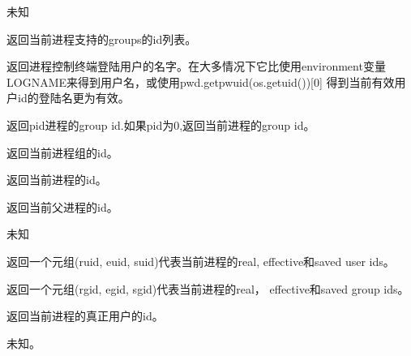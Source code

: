 \noindent{\color{red}{os.getgrouplist(user, group):}}
\par{未知}\\

\noindent{\color{red}{os.getgroups():}}
\par{返回当前进程支持的groups的id列表。}\\

\noindent{\color{red}{os.getlogin():}}
\par{返回进程控制终端登陆用户的名字。在大多情况下它比使用environment变量LOGNAME来得到用户名，或使用pwd.getpwuid(os.getuid())[0] 得到当前有效用户id的登陆名更为有效。}\\

\noindent{\color{red}{os.getpgid(pid):}}
\par{返回pid进程的group id.如果pid为0,返回当前进程的group id。}\\

\noindent{\color{red}{os.getpgrp():}}
\par{返回当前进程组的id。}\\

\noindent{\color{red}{os.getpid():}}
\par{返回当前进程的id。}\\

\noindent{\color{red}{os.getppid():}}
\par{返回当前父进程的id。}\\

\noindent{\color{red}{os.getpriority(which, who):}}
\par{未知}\\

\noindent{\color{red}{os.getresuid():}}
\par{返回一个元组(ruid, euid, suid)代表当前进程的real, effective和saved user ids。}\\

\noindent{\color{red}{os.getresgid():}}
\par{返回一个元组(rgid, egid, sgid)代表当前进程的real， effective和saved group ids。}\\

\noindent{\color{red}{os.getuid():}}
\par{返回当前进程的真正用户的id。}\\

\noindent{\color{red}{os.initgroups(username, gid):}}
\par{未知。}\\






